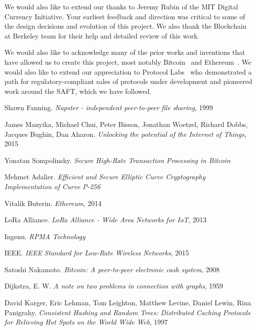 \documentclass[10pt, nonatbib, nocopyrightspace, reprint]{sigplanconf}
\begin{document}
We would also like to extend our thanks to Jeremy Rubin of the MIT Digital Currency Initiative. Your earliest feedback and direction was critical to some of the design decisions and evolution of this project. We also thank the Blockchain at Berkeley team for their help and detailed review of this work.

We would also like to acknowledge many of the prior works and inventions that have allowed us to create this project, most notably Bitcoin~\cite{bitcoin} and Ethereum~\cite{ethereum}. We would also like to extend our appreciation to Protocol Labs~\cite{protocol} who demonstrated a path for regulatory-compliant sales of protocols under development and pioneered work around the SAFT, which we have followed.
\newpage

\begin{thebibliography}{10}
\softraggedright

    Shawn Fanning. 
    \emph{Napster - independent peer-to-peer file sharing}, 1999

    James Manyika, Michael Chui, Peter Bisson, Jonathan Woetzel, Richard Dobbs, Jacques Bughin, Dan Aharon. 
    \emph{Unlocking the potential of the Internet of Things}, 2015

    Yonatan Sompolinsky. 
    \emph{Secure High-Rate Transaction Processing in Bitcoin}

    Mehmet Adalier. 
    \emph{Efficient and Secure Elliptic Curve Cryptography Implementation of Curve P-256}

    Vitalik Buterin. 
    \emph{Ethereum}, 2014

    LoRa Alliance. 
    \emph{LoRa Alliance - Wide Area Networks for IoT}, 2013

    Ingenu. 
    \emph{RPMA Technology}

    IEEE. 
    \emph{IEEE Standard for Low-Rate Wireless Networks}, 2015

    Satoshi Nakamoto. 
    \emph{Bitcoin: A peer-to-peer electronic cash system}, 2008

    Dijkstra, E. W. 
    \emph{A note on two problems in connection with graphs}, 1959

    David Karger, Eric Lehman, Tom Leighton, Matthew Levine, Daniel Lewin, Rina Panigrahy. 
    \emph{Consistent Hashing and Random Trees: Distributed Caching Protocols for Relieving Hot Spots on the World Wide Web}, 1997


\end{thebibliography}
\end{document}
